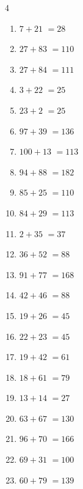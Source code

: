 \begin{multicols}{4}
\begin{enumerate}
  \item $7+21$
        $=28$

  \item $27+83$
        $=110$

  \item $27+84$
        $=111$

  \item $3+22$
        $=25$

  \item $23+2$
        $=25$

  \item $97+39$
        $=136$

  \item $100+13$
        $=113$

  \item $94+88$
        $=182$

  \item $85+25$
        $=110$

  \item $84+29$
        $=113$

  \item $2+35$
        $=37$

\columnbreak %

  \item $36+52$
        $=88$

  \item $91+77$
        $=168$

  \item $42+46$
        $=88$

  \item $19+26$
        $=45$

  \item $22+23$
        $=45$

  \item $19+42$
        $=61$

  \item $18+61$
        $=79$

  \item $13+14$
        $=27$

  \item $63+67$
        $=130$

  \item $96+70$
        $=166$

  \item $69+31$
        $=100$

  \item $60+79$
        $=139$


\end{enumerate}
\end{multicols}
